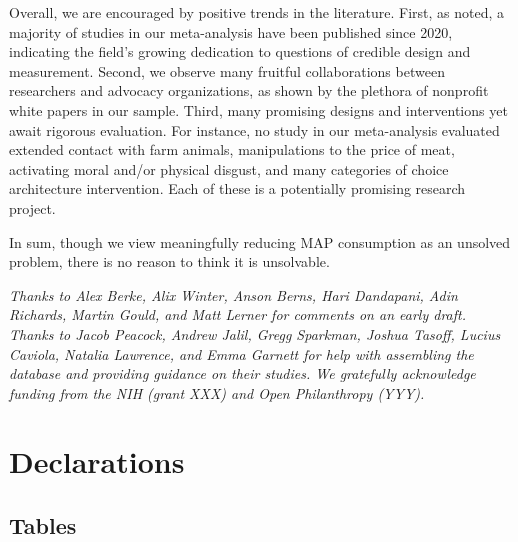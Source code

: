 \documentclass[sn-nature,referee,pdflatex]{sn-jnl}
\begin{document}
Overall, we are encouraged by positive trends in the literature. First,
as noted, a majority of studies in our meta-analysis have been published
since 2020, indicating the field's growing dedication to questions of
credible design and measurement. Second, we observe many fruitful
collaborations between researchers and advocacy organizations, as shown
by the plethora of nonprofit white papers in our sample. Third, many
promising designs and interventions yet await rigorous evaluation. For
instance, no study in our meta-analysis evaluated extended contact with
farm animals, manipulations to the price of meat, activating moral
and/or physical disgust, and many categories of choice architecture
intervention. Each of these is a potentially promising research project.

In sum, though we view meaningfully reducing MAP consumption as an
unsolved problem, there is no reason to think it is unsolvable.


\emph{Thanks to Alex Berke, Alix Winter, Anson Berns, Hari Dandapani,
Adin Richards, Martin Gould, and Matt Lerner for comments on an early
draft. Thanks to Jacob Peacock, Andrew Jalil, Gregg Sparkman, Joshua
Tasoff, Lucius Caviola, Natalia Lawrence, and Emma Garnett for help with
assembling the database and providing guidance on their studies. We
gratefully acknowledge funding from the NIH (grant XXX) and Open
Philanthropy (YYY).}

\section*{Declarations}\label{declarations}

\newpage

\subsection{Tables}\label{tables}
\end{document}
